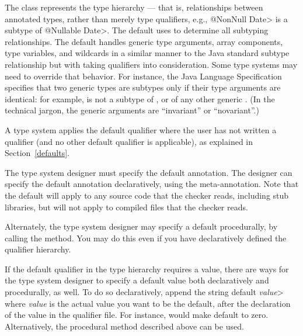 The  class represents the type hierarchy ---
that is, relationships between
annotated types, rather than merely type qualifiers, e.g., \<@NonNull
Date> is a subtype of \<@Nullable Date>.  The default  uses
 to determine all subtyping relationships.
The default  handles
generic type arguments, array components, type variables, and
wildcards in a similar manner to the Java standard subtype
relationship but with taking qualifiers into consideration.  Some type
systems may need to override that behavior.  For instance, the Java
Language Specification specifies that two generic types are subtypes only
if their type arguments are identical:  for example,
 is not a subtype of , or of any other
generic .
(In the technical jargon, the generic arguments are ``invariant'' or ``novariant''.)



A type system applies the default qualifier where the user has not written a
qualifier (and no other default qualifier is applicable), as explained in
Section~\ref{defaults}.

The type system designer must specify the default annotation. The designer can specify the default annotation declaratively,
using the 
meta-annotation.
Note that the default will apply to any source code that the checker reads,
including stub libraries, but will not apply to compiled 
files that the checker reads.

\begin{sloppypar}
Alternately, the type system designer may specify a default procedurally,
by calling the
method.  You may do this even if you have declaratively defined the
qualifier hierarchy.
\end{sloppypar}

If the default qualifier in the type hierarchy requires a value, there are
ways for the type system designer to specify a default value both
declaratively and procedurally, as well.  To do so declaratively, append
the string \<default \emph{value}> where \emph{value} is the actual value
you want to be the default, after the declaration of the value in the
qualifier file.  For instance,  would make
 default to zero. Alternatively, the procedural method
described above can be used.

